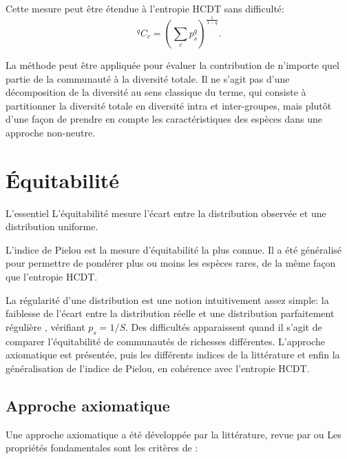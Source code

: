 \documentclass[
  11pt,
  french,
  a4paper,
  extrafontsizes,onecolumn,openright
  ]{memoir}
\newenvironment{Essentiel}
  {\begin{bclogo}[logo=\bctrombone, noborder=true, couleur=lightgray!50]{L'essentiel}\parindent0pt}
  {\end{bclogo}}
\begin{document}
Cette mesure peut être étendue à l'entropie HCDT sans difficulté:
\begin{equation}
  \label{eq:Ccq}
  \mathit{^{q}\!C_{c}} = {\left(\sum_c{p^q_s}\right)}^{\frac{1}{1-q}}.
\end{equation}

La méthode peut être appliquée pour évaluer la contribution de n'importe quel partie de la communauté à la diversité totale.
Il ne s'agit pas d'une décomposition de la diversité au sens classique du terme, qui consiste à partitionner la diversité totale en diversité intra et inter-groupes, mais plutôt d'une façon de prendre en compte les caractéristiques des espèces dans une approche non-neutre.

\hypertarget{sec:Equitabilite}{%
\chapter{Équitabilité}\label{sec:Equitabilite}}

\scriptsize

\begin{Essentiel}
L'équitabilité mesure l'écart entre la distribution observée et une
distribution uniforme.

L'indice de Pielou est la mesure d'équitabilité la plus connue. Il a été
généralisé pour permettre de pondérer plus ou moins les espèces rares,
de la même façon que l'entropie HCDT.
\end{Essentiel}

\normalsize

La régularité d'une distribution est une notion intuitivement assez simple: la faiblesse de l'écart entre la distribution réelle et une distribution parfaitement régulière \autocite{Lloyd1964}, vérifiant \(p_s={1}/{S}\).
Des difficultés apparaissent quand il s'agit de comparer l'équitabilité de communautés de richesses différentes.
L'approche axiomatique est présentée, puis les différents indices de la littérature et enfin la généralisation de l'indice de Pielou, en cohérence avec l'entropie HCDT.

\hypertarget{approche-axiomatique}{%
\section{Approche axiomatique}\label{approche-axiomatique}}

Une approche axiomatique a été développée par la littérature, revue par \textcite{Jost2010} ou \textcite{Tuomisto2012} Les propriétés fondamentales sont les critères de \textcite{Dalton1920}:
\end{document}
